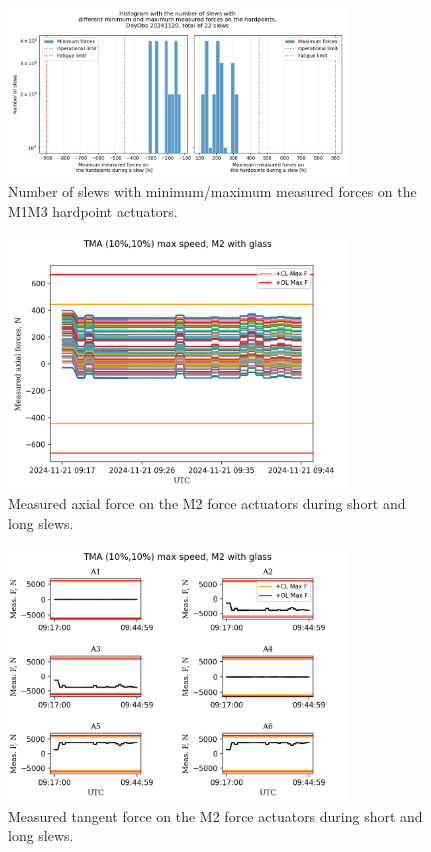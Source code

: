 \begin{figure}
    \centering
    \includegraphics[width=0.8\textwidth]{spa/M1M3_short_long_slews_10_histogram.png}
    \caption{Number of slews with minimum/maximum measured forces on the M1M3 hardpoint actuators.}
    \label{fig:m1m3_short_long_slews}
    \end{figure}

\begin{figure}
    \centering
    \includegraphics[width=0.8\textwidth]{spa/M2_short_long_slews_axial_measured_force_10.png}
    \caption{Measured axial force on the M2 force actuators during short and long slews.}
    \label{fig:m2_short_long_slews_axial}
    \end{figure}

\begin{figure}
    \centering
    \includegraphics[width=0.8\textwidth]{spa/M2_short_long_slews_Tangent_measured_forces_TMA_10.png}
    \caption{Measured tangent force on the M2 force actuators during short and long slews.}
    \label{fig:m2_short_long_slews_tangent}
    \end{figure}

